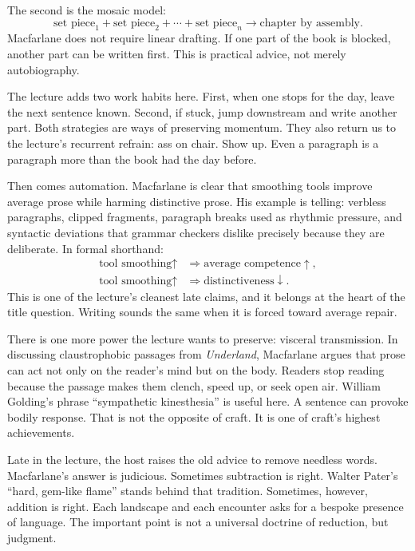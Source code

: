 The second is the mosaic model:
\begin{equation}
\text{set piece}_1 + \text{set piece}_2 + \cdots + \text{set piece}_n
\longrightarrow \text{chapter by assembly}.
\end{equation}
Macfarlane does not require linear drafting. If one part of the book is blocked, another part can be written first. This is practical advice, not merely autobiography.

The lecture adds two work habits here. First, when one stops for the day, leave the next sentence known. Second, if stuck, jump downstream and write another part. Both strategies are ways of preserving momentum. They also return us to the lecture's recurrent refrain: ass on chair. Show up. Even a paragraph is a paragraph more than the book had the day before.

Then comes automation. Macfarlane is clear that smoothing tools improve average prose while harming distinctive prose. His example is telling: verbless paragraphs, clipped fragments, paragraph breaks used as rhythmic pressure, and syntactic deviations that grammar checkers dislike precisely because they are deliberate. In formal shorthand:
\begin{align}
\text{tool smoothing} \uparrow &\Longrightarrow \text{average competence} \uparrow,\\
\text{tool smoothing} \uparrow &\Longrightarrow \text{distinctiveness} \downarrow.
\end{align}
This is one of the lecture's cleanest late claims, and it belongs at the heart of the title question. Writing sounds the same when it is forced toward average repair.

There is one more power the lecture wants to preserve: visceral transmission. In discussing claustrophobic passages from \emph{Underland}, Macfarlane argues that prose can act not only on the reader's mind but on the body. Readers stop reading because the passage makes them clench, speed up, or seek open air. William Golding's phrase ``sympathetic kinesthesia'' is useful here. A sentence can provoke bodily response. That is not the opposite of craft. It is one of craft's highest achievements.

Late in the lecture, the host raises the old advice to remove needless words. Macfarlane's answer is judicious. Sometimes subtraction is right. Walter Pater's ``hard, gem-like flame'' stands behind that tradition. Sometimes, however, addition is right. Each landscape and each encounter asks for a bespoke presence of language. The important point is not a universal doctrine of reduction, but judgment.

